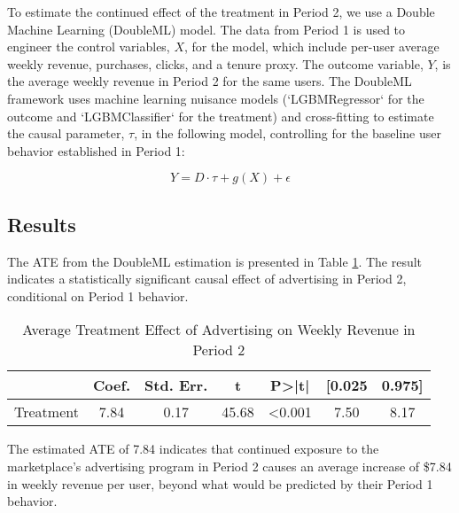 To estimate the continued effect of the treatment in Period 2, we use a Double Machine Learning (DoubleML) model. The data from Period 1 is used to engineer the control variables, $X$, for the model, which include per-user average weekly revenue, purchases, clicks, and a tenure proxy. The outcome variable, $Y$, is the average weekly revenue in Period 2 for the same users. The DoubleML framework uses machine learning nuisance models (`LGBMRegressor` for the outcome and `LGBMClassifier` for the treatment) and cross-fitting to estimate the causal parameter, $\tau$, in the following model, controlling for the baseline user behavior established in Period 1:

\begin{equation}
Y = D \cdot \tau + g(X) + \epsilon
\end{equation}

\subsection*{Results}
The ATE from the DoubleML estimation is presented in Table \ref{tab:ate_results}. The result indicates a statistically significant causal effect of advertising in Period 2, conditional on Period 1 behavior.

\begin{table}[htbp!]
\centering
\caption{Average Treatment Effect of Advertising on Weekly Revenue in Period 2}
\label{tab:ate_results}
\begin{tabular}{lcccccc}
\toprule
 & Coef. & Std. Err. & t & P>|t| & [0.025 & 0.975] \\
\midrule
Treatment & 7.84 & 0.17 & 45.68 & <0.001 & 7.50 & 8.17 \\
\bottomrule
\end{tabular}
\end{table}

The estimated ATE of 7.84 indicates that continued exposure to the marketplace's advertising program in Period 2 causes an average increase of \$7.84 in weekly revenue per user, beyond what would be predicted by their Period 1 behavior.